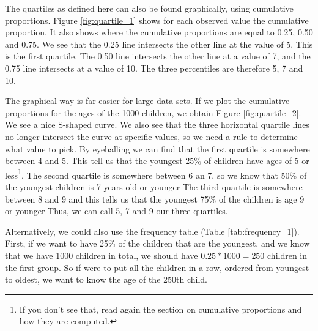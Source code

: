 The quartiles as defined here can also be found graphically, using cumulative proportions. Figure \ref{fig:quartile_1} shows for each observed value the cumulative proportion. It also shows where the cumulative proportions are equal to 0.25, 0.50 and 0.75. We see that the 0.25 line intersects the other line at the value of 5. This is the first quartile. The 0.50 line intersects the other line at a value of 7, and the 0.75 line intersects at a value of 10. The three percentiles are therefore 5, 7 and 10.


\begin{kframe}


{\ttfamily\noindent\bfseries{}}\end{kframe}

The graphical way is far easier for large data sets. If we plot the cumulative proportions for the ages of the 1000 children, we obtain Figure \ref{fig:quartile_2}. We see a nice S-shaped curve. We also see that the three horizontal quartile lines no longer intersect the curve at specific values, so we need a rule to determine what value to pick. By eyeballing we can find that the first quartile is somewhere between 4 and 5. This tell us that the youngest 25\% of children have ages of 5 or less\footnote{If you don't see that, read again the section on cumulative proportions and how they are computed.}. The second quartile is somewhere between 6 an 7, so we know that 50\% of the youngest children is 7 years old or younger The third quartile is somewhere between 8 and 9 and this tells us that the youngest 75\% of the children is age 9 or younger Thus, we can call 5, 7 and 9 our three quartiles.



\begin{kframe}


{\ttfamily\noindent\bfseries{}}\end{kframe}


Alternatively, we could also use the frequency table (Table \ref{tab:frequency_1}). First, if we want to have 25\% of the children that are the youngest, and we know that we have 1000 children in total, we should have $0.25 * 1000=250$ children in the first group. So if were to put all the children in a row, ordered from youngest to oldest, we want to know the age of the 250th child.

